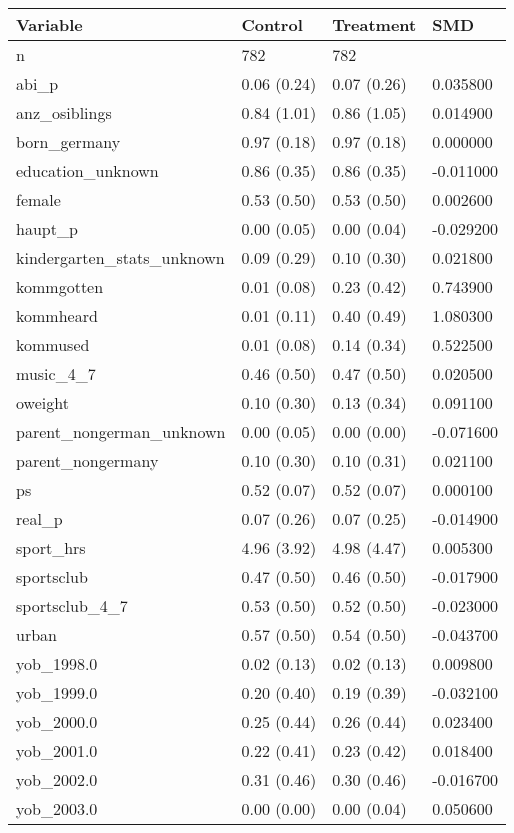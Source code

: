 \begin{tabular}{llll}
\toprule
Variable & Control & Treatment & SMD \\
\midrule
n & 782 & 782 &  \\
abi\_p & 0.06 (0.24) & 0.07 (0.26) & 0.035800 \\
anz\_osiblings & 0.84 (1.01) & 0.86 (1.05) & 0.014900 \\
born\_germany & 0.97 (0.18) & 0.97 (0.18) & 0.000000 \\
education\_unknown & 0.86 (0.35) & 0.86 (0.35) & -0.011000 \\
female & 0.53 (0.50) & 0.53 (0.50) & 0.002600 \\
haupt\_p & 0.00 (0.05) & 0.00 (0.04) & -0.029200 \\
kindergarten\_stats\_unknown & 0.09 (0.29) & 0.10 (0.30) & 0.021800 \\
kommgotten & 0.01 (0.08) & 0.23 (0.42) & 0.743900 \\
kommheard & 0.01 (0.11) & 0.40 (0.49) & 1.080300 \\
kommused & 0.01 (0.08) & 0.14 (0.34) & 0.522500 \\
music\_4\_7 & 0.46 (0.50) & 0.47 (0.50) & 0.020500 \\
oweight & 0.10 (0.30) & 0.13 (0.34) & 0.091100 \\
parent\_nongerman\_unknown & 0.00 (0.05) & 0.00 (0.00) & -0.071600 \\
parent\_nongermany & 0.10 (0.30) & 0.10 (0.31) & 0.021100 \\
ps & 0.52 (0.07) & 0.52 (0.07) & 0.000100 \\
real\_p & 0.07 (0.26) & 0.07 (0.25) & -0.014900 \\
sport\_hrs & 4.96 (3.92) & 4.98 (4.47) & 0.005300 \\
sportsclub & 0.47 (0.50) & 0.46 (0.50) & -0.017900 \\
sportsclub\_4\_7 & 0.53 (0.50) & 0.52 (0.50) & -0.023000 \\
urban & 0.57 (0.50) & 0.54 (0.50) & -0.043700 \\
yob\_1998.0 & 0.02 (0.13) & 0.02 (0.13) & 0.009800 \\
yob\_1999.0 & 0.20 (0.40) & 0.19 (0.39) & -0.032100 \\
yob\_2000.0 & 0.25 (0.44) & 0.26 (0.44) & 0.023400 \\
yob\_2001.0 & 0.22 (0.41) & 0.23 (0.42) & 0.018400 \\
yob\_2002.0 & 0.31 (0.46) & 0.30 (0.46) & -0.016700 \\
yob\_2003.0 & 0.00 (0.00) & 0.00 (0.04) & 0.050600 \\
\bottomrule
\end{tabular}
